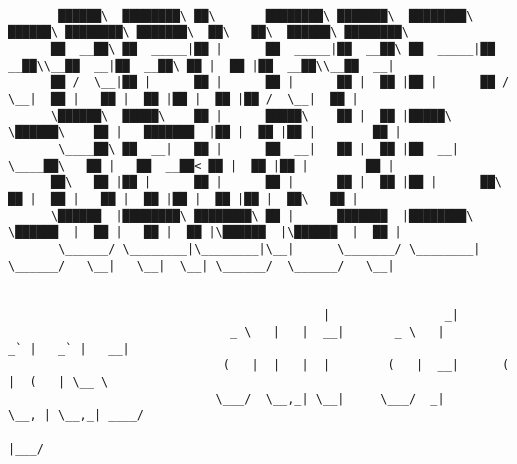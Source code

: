 \documentclass[varwidth=\maxdimen,margin=0.5cm,multi={verbatim}]{standalone}
\begin{document}
\begin{verbatim}

       ██████\  ████████\ ██\       ████████\ ███████\  ████████\  ██████\ ████████\ ███████\  ██\   ██\  ██████\ ████████\ 
      ██  __██\ ██  _____|██ |      ██  _____|██  __██\ ██  _____|██  __██\\__██  __|██  __██\ ██ |  ██ |██  __██\\__██  __|
      ██ /  \__|██ |      ██ |      ██ |      ██ |  ██ |██ |      ██ /  \__|  ██ |   ██ |  ██ |██ |  ██ |██ /  \__|  ██ |   
      \██████\  █████\    ██ |      █████\    ██ |  ██ |█████\    \██████\    ██ |   ███████  |██ |  ██ |██ |        ██ |   
       \____██\ ██  __|   ██ |      ██  __|   ██ |  ██ |██  __|    \____██\   ██ |   ██  __██< ██ |  ██ |██ |        ██ |   
      ██\   ██ |██ |      ██ |      ██ |      ██ |  ██ |██ |      ██\   ██ |  ██ |   ██ |  ██ |██ |  ██ |██ |  ██\   ██ |   
      \██████  |████████\ ████████\ ██ |      ███████  |████████\ \██████  |  ██ |   ██ |  ██ |\██████  |\██████  |  ██ |   
       \______/ \________|\________|\__|      \_______/ \________| \______/   \__|   \__|  \__| \______/  \______/   \__|


                                            |                _|                         
                               _ \   |   |  __|       _ \   |         _` |   _` |   __| 
                              (   |  |   |  |        (   |  __|      (   |  (   | \__ \ 
                             \___/  \__,_| \__|     \___/  _|       \__, | \__,_| ____/ 
                                                                    |___/


\end{verbatim}
\end{document}
